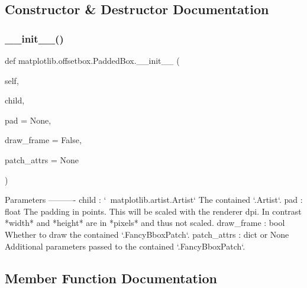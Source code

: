 \subsection{Constructor \& Destructor Documentation}
\mbox{\label{classmatplotlib_1_1offsetbox_1_1PaddedBox_a5bb949d97f91fe2f0ccbaf883fb44395}} 
\subsubsection{\texorpdfstring{\+\_\+\+\_\+init\+\_\+\+\_\+()}{\_\_init\_\_()}}
{\footnotesize\ttfamily def matplotlib.\+offsetbox.\+Padded\+Box.\+\_\+\+\_\+init\+\_\+\+\_\+ (\begin{DoxyParamCaption}\item[{}]{self,  }\item[{}]{child,  }\item[{}]{pad = {\ttfamily None},  }\item[{}]{draw\+\_\+frame = {\ttfamily False},  }\item[{}]{patch\+\_\+attrs = {\ttfamily None} }\end{DoxyParamCaption})}

\begin{DoxyVerb}Parameters
----------
child : `~matplotlib.artist.Artist`
    The contained `.Artist`.
pad : float
    The padding in points. This will be scaled with the renderer dpi.
    In contrast *width* and *height* are in *pixels* and thus not
    scaled.
draw_frame : bool
    Whether to draw the contained `.FancyBboxPatch`.
patch_attrs : dict or None
    Additional parameters passed to the contained `.FancyBboxPatch`.
\end{DoxyVerb}
 

\subsection{Member Function Documentation}
\mbox{\label{classmatplotlib_1_1offsetbox_1_1PaddedBox_ae91687d58b70a1a63b93c32706ac4e79}} 
